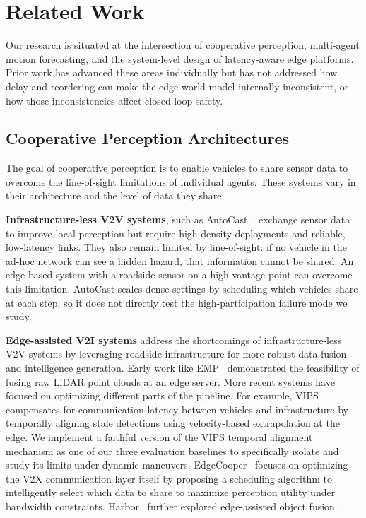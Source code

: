 \section{Related Work}
\label{sec:related}

Our research is situated at the intersection of cooperative perception, multi-agent motion forecasting, and the system-level design of latency-aware edge platforms. Prior work has advanced these areas individually but has not addressed how delay and reordering can make the edge world model internally inconsistent, or how those inconsistencies affect closed-loop safety.

\subsection{Cooperative Perception Architectures}
The goal of cooperative perception is to enable vehicles to share sensor data to overcome the line-of-sight limitations of individual agents. These systems vary in their architecture and the level of data they share.

\textbf{Infrastructure-less V2V systems}, such as AutoCast~\cite{Autocast}, exchange sensor data to improve local perception but require high-density deployments and reliable, low-latency links. They also remain limited by line-of-sight: if no vehicle in the ad-hoc network can see a hidden hazard, that information cannot be shared. An edge-based system with a roadside sensor on a high vantage point can overcome this limitation. AutoCast scales dense settings by scheduling which vehicles share at each step, so it does not directly test the high-participation failure mode we study.

\textbf{Edge-assisted V2I systems} address the shortcomings of infra\-structure-less V2V systems by leveraging roadside infrastructure for more robust data fusion and intelligence generation. Early work like EMP~\cite{EMP} demonstrated the feasibility of fusing raw LiDAR point clouds at an edge server. More recent systems have focused on optimizing different parts of the pipeline. For example, VIPS~\cite{vips2022} compensates for communication latency between vehicles and infrastructure by temporally aligning stale detections using velocity-based extrapolation at the edge. We implement a faithful version of the VIPS temporal alignment mechanism as one of our three evaluation baselines to specifically isolate and study its limits under dynamic maneuvers. EdgeCooper~\cite{edgecooper2023} focuses on optimizing the V2X communication layer itself by proposing a scheduling algorithm to intelligently select which data to share to maximize perception utility under bandwidth constraints. Harbor~\cite{harbor} further explored edge-assisted object fusion.

